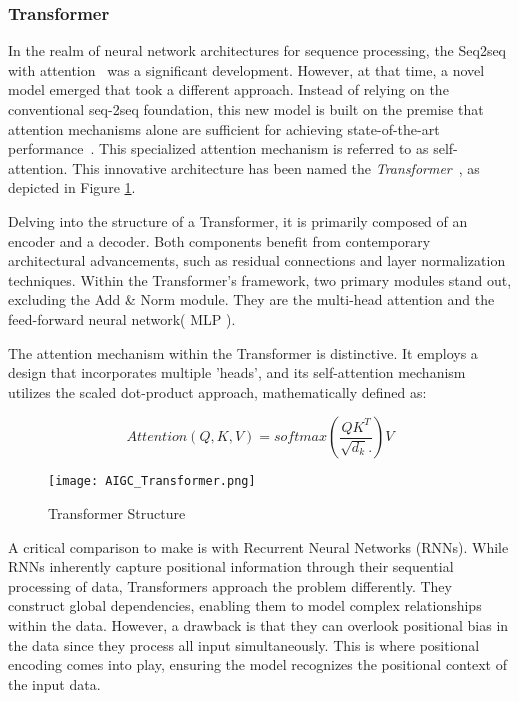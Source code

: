 \documentclass[preprint,12pt,authoryear]{elsarticle}
\begin{document}
\subsubsection{Transformer}

In the realm of neural network architectures for sequence processing, the Seq2seq with attention~\cite{86_seq_atten} was a significant development. However, at that time, a novel model emerged that took a different approach. Instead of relying on the conventional seq-2seq foundation, this new model is built on the premise that attention mechanisms alone are sufficient for achieving state-of-the-art performance~\cite{85_transformer}. This specialized attention mechanism is referred to as self-attention. This innovative architecture has been named the \textit{Transformer}~\cite{85_transformer}, as depicted in Figure \ref{fig:transformer}.

Delving into the structure of a Transformer, it is primarily composed of an encoder and a decoder. Both components benefit from contemporary architectural advancements, such as residual connections \cite{87_resnet} and layer normalization techniques. Within the Transformer's framework, two primary modules stand out, excluding the Add \& Norm module. They are the multi-head attention and the feed-forward neural network( MLP ).

The attention mechanism within the Transformer is distinctive. It employs a design that incorporates multiple 'heads', and its self-attention mechanism utilizes the scaled dot-product approach, mathematically defined as:

\begin{equation}
Attention(Q, K, V) = softmax(\frac{QK^T}{\sqrt{d_k}.})V
\end{equation}

\begin{figure}
    \centering
    \centerline{\texttt{[image: AIGC\_Transformer.png]}}
    \caption{Transformer Structure\cite{85_transformer} }
    \label{fig:transformer}
\end{figure}
A critical comparison to make is with Recurrent Neural Networks (RNNs)\cite{89_RNN,90_RNN,91_RNN}. While RNNs inherently capture positional information through their sequential processing of data, Transformers approach the problem differently. They construct global dependencies, enabling them to model complex relationships within the data. However, a drawback is that they can overlook positional bias in the data since they process all input simultaneously. This is where positional encoding comes into play, ensuring the model recognizes the positional context of the input data.\cite{92_RNN}
\end{document}
